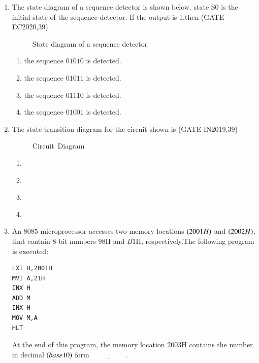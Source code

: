 \begin{enumerate}
\item The state diagram of a sequence detector is shown below. state S0 is the initial state of the sequence detector. If the output is 1,then
                                        \hfill(GATE-EC2020,39)
\begin{figure}[H]
    \centering
    
    \caption{State diagram of a sequence detector}
    	
\end{figure}
\begin{enumerate}
\item   the sequence $01010$ is detected.
\item   the sequence $01011$ is detected.
\item   the sequence $01110$ is detected.
\item   the sequence $01001$ is detected.
\end{enumerate}


\item The state transition diagram for the circuit shown is
                         \hfill(GATE-IN2019,39)
\begin{figure}[H]
\centering

\caption{Circuit~Diagram}
\end{figure}

\begin{enumerate}
\item 
\begin{figure}[H]
\centering

\end{figure}
\item \begin{figure}[H]
\centering

\end{figure}
\item 
\begin{figure}[H]
\centering

\end{figure}
\item 
\begin{figure}[H]
\centering

\end{figure}

\end{enumerate}
\item An $8085$ microprocessor accesses two memory locations $\left(2001H\right)$ and $\left(2002H\right)$, that contain $8$-bit numbers $98$H and $B1$H, respectively.The following program is executed:
\begin{verbatim}LXI H,2001H
MVI A,21H
INX H
ADD M
INX H
MOV M,A
HLT
\end{verbatim}
At the end of this program, the memory location $2003$H contains the number in decimal $\left(base 10\right)$ form $\underline{\hspace{2cm}}$.


\end{enumerate}
